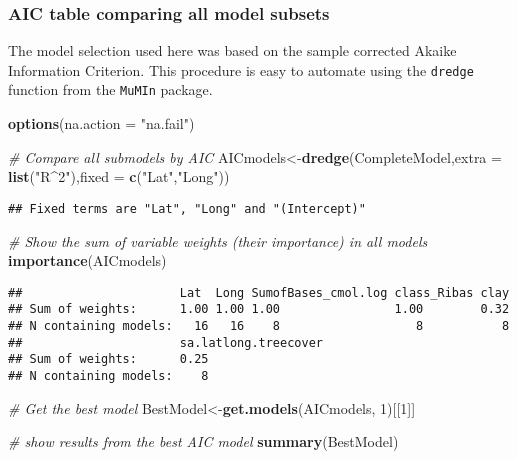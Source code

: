 \documentclass[]{article}
\newenvironment{Shaded}{\begin{snugshade}}{\end{snugshade}}
\newcommand{\CommentTok}[1]{\textcolor[rgb]{0.56,0.35,0.01}{\textit{#1}}}
\newcommand{\DataTypeTok}[1]{\textcolor[rgb]{0.13,0.29,0.53}{#1}}
\newcommand{\DecValTok}[1]{\textcolor[rgb]{0.00,0.00,0.81}{#1}}
\newcommand{\KeywordTok}[1]{\textcolor[rgb]{0.13,0.29,0.53}{\textbf{#1}}}
\newcommand{\NormalTok}[1]{#1}
\newcommand{\StringTok}[1]{\textcolor[rgb]{0.31,0.60,0.02}{#1}}
\begin{document}
\hypertarget{aic-table-comparing-all-model-subsets}{%
\subsubsection{AIC table comparing all model
subsets}\label{aic-table-comparing-all-model-subsets}}

The model selection used here was based on the sample corrected Akaike
Information Criterion. This procedure is easy to automate using the
\texttt{dredge} function from the \texttt{MuMIn} package.

\begin{Shaded}
\begin{Highlighting}[]
\KeywordTok{options}\NormalTok{(}\DataTypeTok{na.action =} \StringTok{"na.fail"}\NormalTok{)}

\CommentTok{# Compare all submodels by AIC  }
\NormalTok{AICmodels<-}\KeywordTok{dredge}\NormalTok{(CompleteModel,}\DataTypeTok{extra =} \KeywordTok{list}\NormalTok{(}\StringTok{"R^2"}\NormalTok{),}\DataTypeTok{fixed =} \KeywordTok{c}\NormalTok{(}\StringTok{"Lat"}\NormalTok{,}\StringTok{"Long"}\NormalTok{))}
\end{Highlighting}
\end{Shaded}

\begin{verbatim}
## Fixed terms are "Lat", "Long" and "(Intercept)"
\end{verbatim}

\begin{Shaded}
\begin{Highlighting}[]
\CommentTok{# Show the sum of variable weights (their importance) in all models}
\KeywordTok{importance}\NormalTok{(AICmodels)}
\end{Highlighting}
\end{Shaded}

\begin{verbatim}
##                      Lat  Long SumofBases_cmol.log class_Ribas clay
## Sum of weights:      1.00 1.00 1.00                1.00        0.32
## N containing models:   16   16    8                   8           8
##                      sa.latlong.treecover
## Sum of weights:      0.25                
## N containing models:    8
\end{verbatim}

\begin{Shaded}
\begin{Highlighting}[]
\CommentTok{# Get the best model}
\NormalTok{BestModel<-}\KeywordTok{get.models}\NormalTok{(AICmodels, }\DecValTok{1}\NormalTok{)[[}\DecValTok{1}\NormalTok{]]}

\CommentTok{# show results from the best AIC model}
\KeywordTok{summary}\NormalTok{(BestModel)}
\end{Highlighting}
\end{Shaded}
\end{document}
